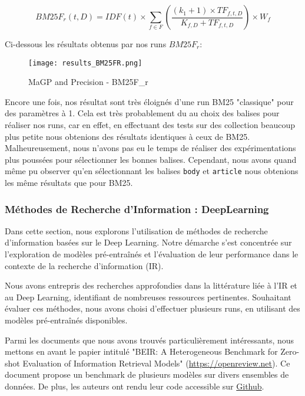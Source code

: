 \documentclass[a4paper, 12pt]{article}
\begin{document}
\begin{equation}
\text{$BM25F_r$}(t, D) = IDF(t) \times \sum_{f \in F} \left( \frac{(k_1 + 1) \times TF_{f, t, D}}{K_{f, D} + TF_{f, t, D}} \right) \times W_f
\end{equation}

Ci-dessous les résultats obtenus par nos runs $BM25F_r$:
\begin{figure}[h]
    \centering
    \texttt{[image: results\_BM25FR.png]}
    \caption{MaGP and Precision - BM25F_r}
    \label{fig:enter-label}
\end{figure}

Encore une fois, nos résultat sont très éloignés d'une run BM25 "classique" pour des paramètres à 1. Cela est très probablement du au choix des balises pour réaliser nos runs, car en effet, 
en effectuant des tests sur des collection beaucoup plus petite nous obtenions des résultats identiques à ceux de BM25.
Malheureusement, nous n'avons pas eu le temps de réaliser des expérimentations plus poussées pour sélectionner les bonnes balises. Cependant, nous avons quand même
pu observer qu'en sélectionnant les balises \texttt{body} et \texttt{article} nous obtenions les même résultats que pour BM25.

\newpage


\subsubsection{Méthodes de Recherche d'Information : DeepLearning}

Dans cette section, nous explorons l'utilisation de méthodes de recherche d'information basées
sur le Deep Learning. Notre démarche s'est concentrée sur l'exploration de modèles pré-entraînés
et l'évaluation de leur performance dans le contexte de la recherche d'information (IR).

Nous avons entrepris des recherches approfondies dans la littérature liée à l'IR et au Deep Learning,
identifiant de nombreuses ressources pertinentes.
Souhaitant évaluer ces méthodes, nous avons choisi d'effectuer plusieurs runs, en utilisant 
des modèles pré-entraînés disponibles.

Parmi les documents que nous avons trouvés particulièrement intéressants, nous mettons en avant le papier 
intitulé "BEIR: A Heterogeneous Benchmark for Zero-shot Evaluation of Information Retrieval Models" 
(\href{https://openreview.net/forum?id=wCu6T5xFjeJ}{https://openreview.net}). 
Ce document propose un benchmark de plusieurs modèles sur divers ensembles de données. 
De plus, les auteurs ont rendu leur code accessible sur \href{https://github.com/beir-cellar/beir}{Github}.
\end{document}
